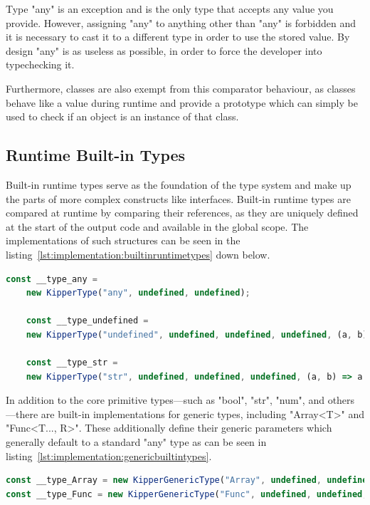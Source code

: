 Type "any" is an exception and is the only type that accepts any value you provide. However, assigning "any" to anything other than "any" is forbidden and it is necessary to cast it to a different type in order to use the stored value. By design "any" is as useless as possible, in order to force the developer into typechecking it.

Furthermore, classes are also exempt from this comparator behaviour, as classes behave like a value during runtime and provide a prototype which can simply be used to check if an object is an instance of that class.

\subsection{Runtime Built-in Types}

Built-in runtime types serve as the foundation of the type system and make up the parts of more complex constructs like interfaces. Built-in runtime types are compared at runtime by comparing their references, as they are uniquely defined at the start of the output code and available in the global scope. The implementations of such structures can be seen in the listing~\ref{lst:implementation:builtinruntimetypes} down below.

\begin{lstlisting}[language=TypeScript,caption=Examples for the built-in runtime types,label=lst:implementation:builtinruntimetypes]
	const __type_any =
	new KipperType("any", undefined, undefined);

	const __type_undefined =
	new KipperType("undefined", undefined, undefined, undefined, (a, b) => a.name === b.name);

	const __type_str =
	new KipperType("str", undefined, undefined, undefined, (a, b) => a.name === b.name);
\end{lstlisting}

In addition to the core primitive types—such as "bool", "str", "num", and others—there are built-in implementations for generic types, including "Array<T>" and "Func<T..., R>". These additionally define their generic parameters which generally default to a standard "any" type as can be seen in listing~\ref{lst:implementation:genericbuiltintypes}.

\begin{lstlisting}[language=Typescript,caption=Generic built-in types,label=lst:implementation:genericbuiltintypes]
const __type_Array = new KipperGenericType("Array", undefined, undefined, {T: __type_any});
const __type_Func = new KipperGenericType("Func", undefined, undefined, {T: [], R: __type_any});
\end{lstlisting}

